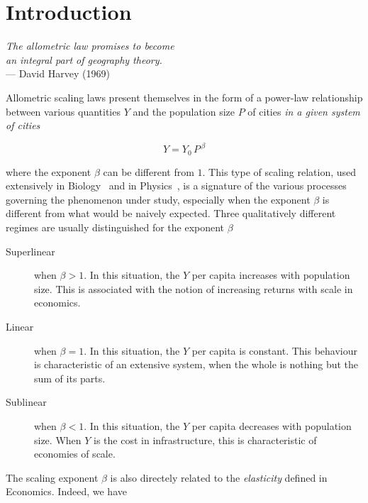 \chapter{Introduction}
\label{sec:scaling_introduction}

\begin{flushright}{\slshape    
The allometric law promises to become\\
an integral part of geography theory.} \\ \medskip
--- David Harvey (1969)~\cite{Harvey:1969} 
\end{flushright}

Allometric scaling laws present themselves in the form of a power-law
relationship between various quantities $Y$ and the population size $P$ of
cities \emph{in a given system of cities} 

\begin{equation}
    Y = Y_0\,P^{\,\beta}
\end{equation}

where the exponent $\beta$ can be different from $1$. This type of scaling
relation, used extensively in Biology~\cite{Thompson:1942} and in
Physics~\cite{Barenblatt:1996}, is a signature of the various processes
governing the phenomenon under study, especially when the exponent $\beta$ is
different from what would be naively expected. Three qualitatively different regimes are
usually
distinguished for the exponent $\beta$~\cite{Bettencourt:2007}

\begin{description}
    \item[Superlinear] when $\beta>1$. In this situation, the $Y$ per capita
        increases with population size. This is associated with the notion of
        increasing returns with scale in economics.
    \item[Linear] when $\beta=1$. In this situation, the $Y$ per capita is
        constant. This behaviour is characteristic of an extensive system, when
        the whole is nothing but the sum of its parts.
    \item[Sublinear] when $\beta<1$. In this situation, the $Y$ per capita
        decreases with population size. When $Y$ is the cost in infrastructure,
        this is characteristic of economies of scale.
\end{description}    

The scaling exponent $\beta$ is also directely related to the \emph{elasticity}
defined in Economics. Indeed, we have


